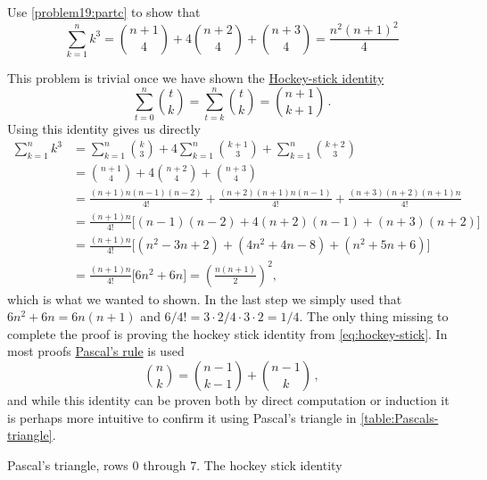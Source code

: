 \documentclass[a4paper, english, 12pt]{article} %
\begin{document}
\begin{subproblem}
  Use \cref{problem19:partc} to show that
  \begin{equation*}
    \sum_{k = 1}^{n} k^3 = \binom{n+1}{4} + 4 \binom{n+2}{4} + \binom{n+3}{4} = \frac{n^2(n+1)^2}{4}
  \end{equation*}
\end{subproblem}

\begin{answer}
  This problem is trivial once we have shown the
  \href{https://en.wikipedia.org/wiki/Hockey-stick_identity}{Hockey-stick
    identity}
  \begin{equation}
    \label{eq:hockey-stick}
    \sum_{t = 0}^{n} \binom{t}{k} = \sum_{t = k}^{n} \binom{t}{k} = \binom{n+1}{k+1}\,.
  \end{equation}
  Using this identity gives us directly
  \begin{align*}
    \sum_{k = 1}^{n} k^3
    & = \sum_{k=1}^{n} \binom{k}{3} + 4\sum_{k=1}^{n} \binom{k+1}{3} + \sum_{k=1}^{n}\binom{k+2}{3} \\
    & = \binom{n+1}{4} + 4 \binom{n+2}{4} + \binom{n+3}{4} \\
    & = \frac{(n+1)n(n-1)(n-2)}{4!} + \frac{(n+2)(n+1)n(n-1)}{4!} + \frac{(n+3)(n+2)(n+1)n}{4!} \\
    & = \frac{(n+1)n}{4!}\bigl[ (n-1)(n-2) + 4(n+2)(n-1) + (n+3)(n+2) \bigr] \\
    & = \frac{(n+1)n}{4!}\bigl[ (n^2 - 3n + 2) + (4n^2 + 4n - 8) + (n^2 + 5n + 6) \bigr] \\
    & = \frac{(n+1)n}{4!}\bigl[ 6n^2 + 6n \bigr] 
      = \left( \frac{n(n+1)}{2} \right)^2,
  \end{align*}
  which is what we wanted to shown. In the last step we simply used that
  $6n^2+6n=6n(n+1)$ and $6/4! = 3\cdot 2 /4 \cdot 3 \cdot 2 = 1/4$.
  The only thing missing to complete the proof is proving the hockey stick
  identity from \cref{eq:hockey-stick}. In most proofs
  \href{https://en.wikipedia.org/wiki/Pascal\%27s_rule}{Pascal's rule} is used
  \begin{equation}
    \label{eq:pascals-rule}
    \binom{n}{k} = \binom{n-1}{k-1} + \binom{n-1}{k}\,,
  \end{equation}
  and while this identity can be proven both by direct computation or induction
  it is perhaps more intuitive to confirm it using Pascal's triangle in
  \cref{table:Pascals-triangle}.
  \begin{table}[H]
    \centering
    \caption{Pascal's triangle, rows $0$ through $7$. The hockey stick identity
}
\end{table}
\end{answer}
\end{document}
